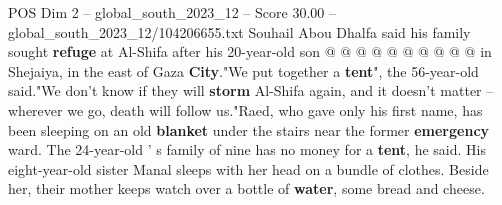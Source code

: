\begin{textsample}{POS Dim 2 – global\_south\_2023\_12 – Score 30.00 – global\_south\_2023\_12/104206655.txt}
Souhail Abou Dhalfa said his family sought \textbf{refuge} at Al-Shifa after his 20-year-old son @ @ @ @ @ @ @ @ @ @ in Shejaiya, in the east of Gaza \textbf{City}."We put together a \textbf{tent}", the 56-year-old said."We don't know if they will \textbf{storm} Al-Shifa again, and it doesn't matter -- wherever we go, death will follow us."Raed, who gave only his first name, has been sleeping on an old \textbf{blanket} under the stairs near the former \textbf{emergency} ward.
The 24-year-old ' s family of nine has no money for a \textbf{tent}, he said.
His eight-year-old sister Manal sleeps with her head on a bundle of clothes.
Beside her, their mother keeps watch over a bottle of \textbf{water}, some bread and cheese.

\end{textsample}
